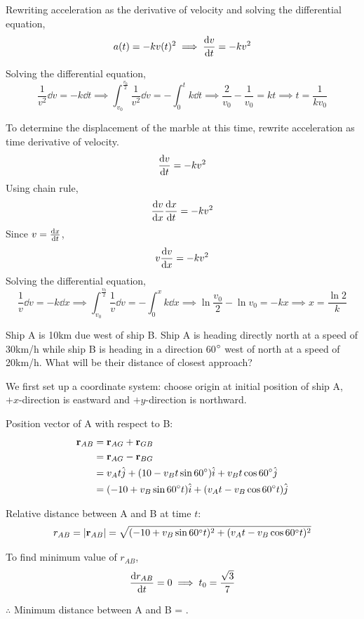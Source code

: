 \begin{solution}
Rewriting acceleration as the derivative of velocity and solving the differential equation,
\[ a(t) = -kv(t)^2 \implies \dv{v}{t} = -kv^2 \]

Solving the differential equation,
\[ \frac{1}{v^2} \dd{v} = -k \dd{t} \implies
\int_{v_0}^{\frac{v_0}{2}} \frac{1}{v^2} \dd{v} = -\int_0^t k \dd{t} \implies
\frac{2}{v_0} - \frac{1}{v_0} = kt \implies 
\boxed{t = \frac{1}{kv_0}} \]

To determine the displacement of the marble at this time, rewrite acceleration as time derivative of velocity.
\[ \dv{v}{t} = -kv^2 \]
Using chain rule,
\[ \dv{v}{x}\dv{x}{t} = -kv^2 \]
Since $v=\dv{x}{t}$,
\[ v\odv{v}{x} = -kv^2 \]
Solving the differential equation,
\[ \frac{1}{v}\dd{v} = -k \dd{x} \implies
\int_{v_0}^{\frac{v_0}{2}}\frac{1}{v} \dd{v} = -\int_0^xk\dd{x} \implies
\ln\frac{v_0}{2}-\ln v_0 = -kx \implies
\boxed{x = \frac{\ln2}{k}} \]
\end{solution}
\pagebreak

\begin{exmp}{}{}
Ship A is 10km due west of ship B. Ship A is heading directly north at a speed of 30km/h while ship B is heading in a direction 60$\degree$ west of north at a speed of 20km/h. What will be their distance of closest approach?
\end{exmp}

\begin{solution}
We first set up a coordinate system: choose origin at initial position of ship A, $+x$-direction is eastward and $+y$-direction is northward.

Position vector of A with respect to B:
\begin{align*}
\vb{r}_{AB} &= \vb{r}_{AG} + \vb{r}_{GB} \\
&= \vb{r}_{AG} - \vb{r}_{BG} \\
&= v_At\hat{j} + (10-v_Bt\sin60\degree)\hat{i}+v_Bt\cos60\degree\hat{j} \\
&= (-10+v_B\sin60\degree t)\hat{i}+(v_At-v_B\cos60\degree t)\hat{j}
\end{align*}

Relative distance between A and B at time $t$:
\[ r_{AB} = |\vb{r}_{AB}| = \sqrt{(-10+v_B\sin60\degree t)^2+(v_At-v_B\cos60\degree t)^2} \]

To find minimum value of $r_{AB}$,
\[ \dv{r_{AB}}{t}=0 \implies t_0=\frac{\sqrt{3}}{7} \]

$\therefore$ Minimum distance between A and B = .
\end{solution}
\pagebreak

